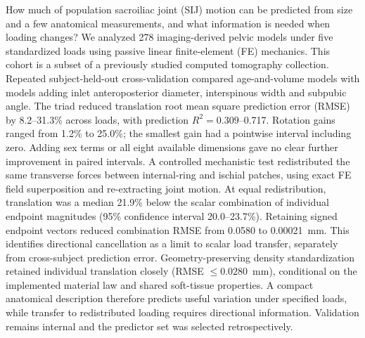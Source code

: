 How much of population sacroiliac joint (SIJ) motion can be predicted from size and a few anatomical measurements, and what information is needed when loading changes? We analyzed 278 imaging-derived pelvic models under five standardized loads using passive linear finite-element (FE) mechanics. This cohort is a subset of a previously studied computed tomography collection. Repeated subject-held-out cross-validation compared age-and-volume models with models adding inlet anteroposterior diameter, interspinous width and subpubic angle. The triad reduced translation root mean square prediction error (RMSE) by 8.2--31.3\% across loads, with prediction $R^2=0.309$--0.717. Rotation gains ranged from 1.2\% to 25.0\%; the smallest gain had a pointwise interval including zero. Adding sex terms or all eight available dimensions gave no clear further improvement in paired intervals. A controlled mechanistic test redistributed the same transverse forces between internal-ring and ischial patches, using exact FE field superposition and re-extracting joint motion. At equal redistribution, translation was a median 21.9\% below the scalar combination of individual endpoint magnitudes (95\% confidence interval 20.0--23.7\%). Retaining signed endpoint vectors reduced combination RMSE from 0.0580 to 0.00021~mm. This identifies directional cancellation as a limit to scalar load transfer, separately from cross-subject prediction error. Geometry-preserving density standardization retained individual translation closely (RMSE $\leq0.0280$~mm), conditional on the implemented material law and shared soft-tissue properties. A compact anatomical description therefore predicts useful variation under specified loads, while transfer to redistributed loading requires directional information. Validation remains internal and the predictor set was selected retrospectively.
